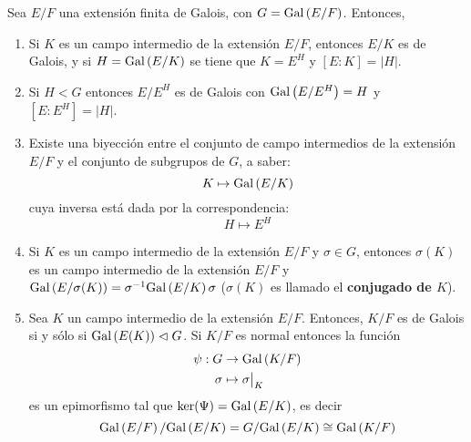 \documentclass[12pt]{report}
\theoremstyle{largebreak}
\newcommand\abs[1]{\ensuremath{\left|#1\right|}}
\begin{document}
    \renewcommand{\theenumi}{\roman{enumi}}

    \begin{theor}
        Sea $E/F$ una extensión finita de Galois, con $G=\textup{Gal}\left(E/F\right)$. Entonces,
        \begin{enumerate}
            \item Si $K$ es un campo intermedio de la extensión $E/F$, entonces $E/K$ es de Galois, y si $H=\textup{Gal}\left(E/K\right)$ se tiene que $K=E^H$ y $[E:K]=\abs{H}$.
            \item Si $H<G$ entonces $E/E^H$ es de Galois con $\textup{Gal}\left(E/E^H\right)=H$ y $[E:E^H]=\abs{H}$.
            \item Existe una biyección entre el conjunto de campo intermedios de la extensión $E/F$ y el conjunto de subgrupos de $G$, a saber:
            \begin{equation*}
                K\mapsto \textup{Gal}\left(E/K\right)
            \end{equation*}
            cuya inversa está dada por la correspondencia:
            \begin{equation*}
                H\mapsto E^H
            \end{equation*}
            \item Si $K$ es un campo intermedio de la extensión $E/F$ y $\sigma\in G$, entonces $\sigma(K)$ es un campo intermedio de la extensión $E/F$ y $\textup{Gal}\left(E/\sigma(K)\right)=\sigma^{-1}\textup{Gal}\left(E/K\right)\sigma$ ($\sigma(K)$ es llamado el \textbf{conjugado de $K$}).
            \item Sea $K$ un campo intermedio de la extensión $E/F$. Entonces, $K/F$ es de Galois si y sólo si $\textup{Gal}\left(E(K)\right)\vartriangleleft G$. Si $K/F$ es normal entonces la función
            \begin{equation*}
                \begin{split}
                    \psi:G&\rightarrow \textup{Gal}\left(K/F\right)\\
                    \sigma&\mapsto \sigma\big|_K\\
                \end{split}
            \end{equation*}
            es un epimorfismo tal que $\ker(\Psi)=\textup{Gal}\left(E/K\right)$, es decir
            \begin{equation*}
                \textup{Gal}\left(E/F\right)/\textup{Gal}\left(E/K\right)=G/\textup{Gal}\left(E/K\right)\cong \textup{Gal}\left(K/F\right)
            \end{equation*}
        \end{enumerate}
    \end{theor}
        
\end{document}

